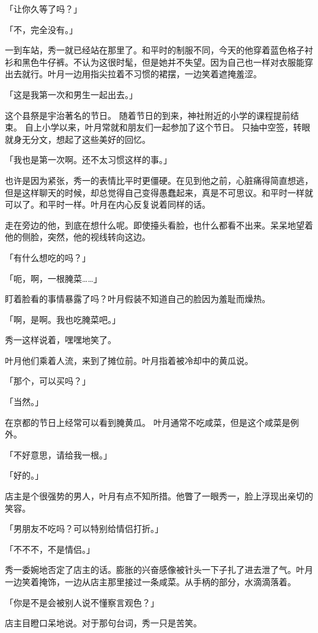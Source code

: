 \documentclass[UTF8]{ctexart}
\begin{document}
    「让你久等了吗？」

    「不，完全没有。」

    一到车站，秀一就已经站在那里了。和平时的制服不同，今天的他穿着蓝色格子衬衫和黑色牛仔裤。不认为这很时髦，但是她并不失望。因为自己也一样对衣服能穿出去就行。叶月一边用指尖拉着不习惯的裙摆，一边笑着遮掩羞涩。

    「这是我第一次和男生一起出去。」

    这个县祭是宇治著名的节日。 随着节日的到来，神社附近的小学的课程提前结束。 自上小学以来，叶月常就和朋友们一起参加了这个节日。 只抽中空签，转眼就身无分文，想起了这些美好的回忆。

    「我也是第一次啊。还不太习惯这样的事。」

    也许是因为紧张，秀一的表情比平时更僵硬。在见到他之前，心脏痛得简直想逃，但是这样聊天的时候，却总觉得自己变得愚蠢起来，真是不可思议。和平时一样就可以了。和平时一样。叶月在内心反复说着同样的话。

    走在旁边的他，到底在想什么呢。即使擡头看脸，也什么都看不出来。呆呆地望着他的侧脸，突然，他的视线转向这边。

    「有什么想吃的吗？」

    「呃，啊，一根腌菜……」

    盯着脸看的事情暴露了吗？叶月假装不知道自己的脸因为羞耻而燥热。

    「啊，是啊。我也吃腌菜吧。」

    秀一这样说着，嘿嘿地笑了。

    叶月他们乘着人流，来到了摊位前。叶月指着被冷却中的黄瓜说。

    「那个，可以买吗？」

    「当然。」

    在京都的节日上经常可以看到腌黄瓜。 叶月通常不吃咸菜，但是这个咸菜是例外。

    「不好意思，请给我一根。」

    「好的。」

    店主是个很强势的男人，叶月有点不知所措。他瞥了一眼秀一，脸上浮现出亲切的笑容。

    「男朋友不吃吗？可以特别给情侣打折。」

    「不不不，不是情侣。」

    秀一委婉地否定了店主的话。膨胀的兴奋感像被针头一下子扎了进去泄了气。叶月一边笑着掩饰，一边从店主那里接过一条咸菜。从手柄的部分，水滴滴落着。

    「你是不是会被别人说不懂察言观色？」

    店主目瞪口呆地说。对于那句台词，秀一只是苦笑。
\end{document}
